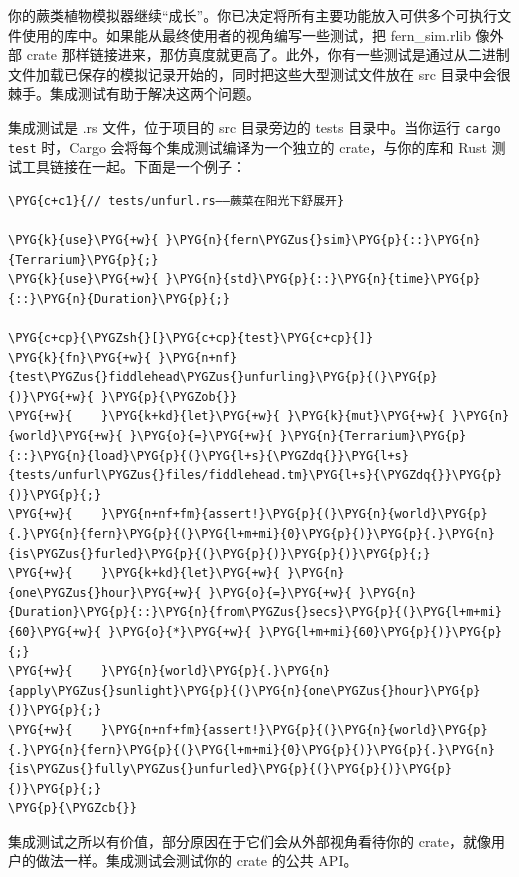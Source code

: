你的蕨类植物模拟器继续“成长”。你已决定将所有主要功能放入可供多个可执行文件使用的库中。如果能从最终使用者的视角编写一些测试，把 fern\_sim.rlib 像外部 crate 那样链接进来，那仿真度就更高了。此外，你有一些测试是通过从二进制文件加载已保存的模拟记录开始的，同时把这些大型测试文件放在 src 目录中会很棘手。集成测试有助于解决这两个问题。

集成测试是 .rs 文件，位于项目的 src 目录旁边的 tests 目录中。当你运行 \texttt{cargo test} 时，Cargo 会将每个集成测试编译为一个独立的 crate，与你的库和 Rust 测试工具链接在一起。下面是一个例子：

\begin{Verbatim}[commandchars=\\\{\},breaklines=true,breakanywhere=true,fontsize=\codefont,xleftmargin=17bp]
\PYG{c+c1}{// tests/unfurl.rs——蕨菜在阳光下舒展开}

\PYG{k}{use}\PYG{+w}{ }\PYG{n}{fern\PYGZus{}sim}\PYG{p}{::}\PYG{n}{Terrarium}\PYG{p}{;}
\PYG{k}{use}\PYG{+w}{ }\PYG{n}{std}\PYG{p}{::}\PYG{n}{time}\PYG{p}{::}\PYG{n}{Duration}\PYG{p}{;}

\PYG{c+cp}{\PYGZsh{}[}\PYG{c+cp}{test}\PYG{c+cp}{]}
\PYG{k}{fn}\PYG{+w}{ }\PYG{n+nf}{test\PYGZus{}fiddlehead\PYGZus{}unfurling}\PYG{p}{(}\PYG{p}{)}\PYG{+w}{ }\PYG{p}{\PYGZob{}}
\PYG{+w}{    }\PYG{k+kd}{let}\PYG{+w}{ }\PYG{k}{mut}\PYG{+w}{ }\PYG{n}{world}\PYG{+w}{ }\PYG{o}{=}\PYG{+w}{ }\PYG{n}{Terrarium}\PYG{p}{::}\PYG{n}{load}\PYG{p}{(}\PYG{l+s}{\PYGZdq{}}\PYG{l+s}{tests/unfurl\PYGZus{}files/fiddlehead.tm}\PYG{l+s}{\PYGZdq{}}\PYG{p}{)}\PYG{p}{;}
\PYG{+w}{    }\PYG{n+nf+fm}{assert!}\PYG{p}{(}\PYG{n}{world}\PYG{p}{.}\PYG{n}{fern}\PYG{p}{(}\PYG{l+m+mi}{0}\PYG{p}{)}\PYG{p}{.}\PYG{n}{is\PYGZus{}furled}\PYG{p}{(}\PYG{p}{)}\PYG{p}{)}\PYG{p}{;}
\PYG{+w}{    }\PYG{k+kd}{let}\PYG{+w}{ }\PYG{n}{one\PYGZus{}hour}\PYG{+w}{ }\PYG{o}{=}\PYG{+w}{ }\PYG{n}{Duration}\PYG{p}{::}\PYG{n}{from\PYGZus{}secs}\PYG{p}{(}\PYG{l+m+mi}{60}\PYG{+w}{ }\PYG{o}{*}\PYG{+w}{ }\PYG{l+m+mi}{60}\PYG{p}{)}\PYG{p}{;}
\PYG{+w}{    }\PYG{n}{world}\PYG{p}{.}\PYG{n}{apply\PYGZus{}sunlight}\PYG{p}{(}\PYG{n}{one\PYGZus{}hour}\PYG{p}{)}\PYG{p}{;}
\PYG{+w}{    }\PYG{n+nf+fm}{assert!}\PYG{p}{(}\PYG{n}{world}\PYG{p}{.}\PYG{n}{fern}\PYG{p}{(}\PYG{l+m+mi}{0}\PYG{p}{)}\PYG{p}{.}\PYG{n}{is\PYGZus{}fully\PYGZus{}unfurled}\PYG{p}{(}\PYG{p}{)}\PYG{p}{)}\PYG{p}{;}
\PYG{p}{\PYGZcb{}}
\end{Verbatim}

集成测试之所以有价值，部分原因在于它们会从外部视角看待你的 crate，就像用户的做法一样。集成测试会测试你的 crate 的公共 API。

